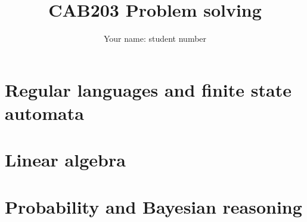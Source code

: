 \documentclass[a4paper]{article}
\author{Your name: student number}
\title{CAB203 Problem solving}
\date{}
\begin{document}
\maketitle

\section{Regular languages and finite state automata}

\section{Linear algebra}

\section{Probability and Bayesian reasoning}
\end{document}
